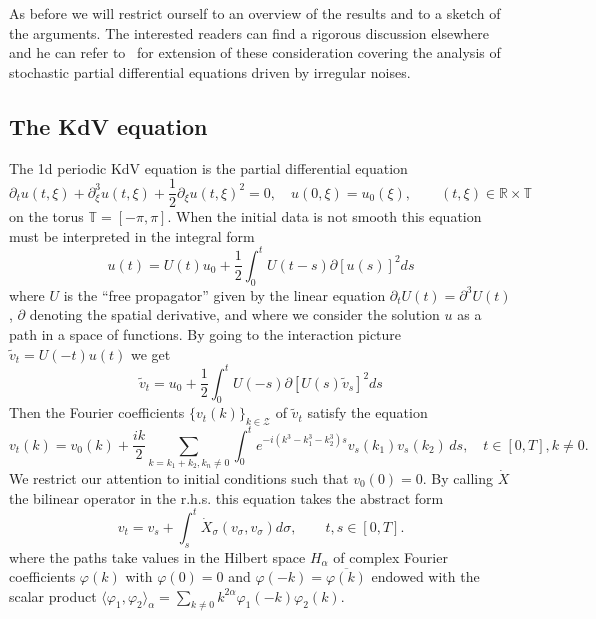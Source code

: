 \documentclass[a4paper]{article}
\newcommand{\1}{{\bf 1}}
\newcommand{\RR}{\mathbb{R}}
\newcommand{\ZZ}{\mathcal{Z}}
\newcommand{\bTT}{\mathbb T}
\newcommand{\RR}{\mathbb{R}}
\begin{document}
\medskip
As before we will restrict ourself to an overview of the results and
to a sketch of the arguments. The
interested readers can find a rigorous discussion
elsewhere~\cite{kdv,MR2227041} and he can refer
to~\cite{TindelGubinelli} for extension of these consideration covering the analysis of stochastic partial differential
equations driven by irregular noises.


\subsection{The KdV equation}
The 1d periodic KdV equation is the partial differential equation
\begin{equation}
  \label{eq:kdv-real}
\partial_t u(t,\xi) + \partial^3_\xi u(t,\xi) +
\frac12 \partial_\xi u(t,\xi)^2 = 0,\quad u(0,\xi) = u_0(\xi), \qquad
(t,\xi)\in\RR\times \bTT  
\end{equation}
on the torus $\bTT = [-\pi,\pi]$. When the initial data is not smooth
this equation must be interpreted in the integral form
\begin{equation*}
u(t) = U(t) u_0 + \frac{1}{2}\int_0^t U(t-s) \partial [u(s)]^2 ds  
\end{equation*}
where $U$ is the ``free propagator'' given by the linear equation
$
\partial_t U(t) = \partial^3 U(t)
$, $\partial$ denoting the spatial derivative, and where we consider the solution $u$ as a path in a space of
functions.
By going to the interaction picture $\tilde v_t = U(-t) u(t)$ we get
\begin{equation*}
\tilde  v_t = u_0 + \frac{1}{2}\int_0^t U(-s) \partial [U(s)\tilde v_s]^2 ds  
\end{equation*}
Then the Fourier coefficients $\{ v_t(k) \}_{k \in \ZZ}$  of $\tilde
v_t$ satisfy the equation
\begin{equation}
  \label{eq:kdv-base}
 v_t(k) =   v_0(k) + \frac{ik}2 \sum_{k=k_1+k_2, k_n \neq 0} \int_0^t e^{- i (k^3-k_1^3-k_2^3) s}
  v_s(k_1) v_s(k_2) \, ds, \quad t \in [0,T], k \neq 0 .
\end{equation}
 We restrict our attention to
initial conditions such that $v_0(0) = 0$. By calling $\dot X$ the
bilinear operator in the r.h.s.
this equation takes the abstract form
$$
v_t = v_s + \int_s^t \dot X_\sigma(v_\sigma,v_\sigma) d\sigma, \qquad
t,s \in [0,T].
$$
where the paths take values in the Hilbert space $H_\alpha$ of complex Fourier
coefficients $\varphi(k)$ with $\varphi(0)=0$ and $\varphi(-k) =
\overline{\varphi(k)}$ endowed with the scalar product
$
\langle \varphi_1, \varphi_2 \rangle_\alpha = \sum_{k \neq 0}
k^{2\alpha} \varphi_1(-k) \varphi_2(k)
$.
\end{document}
